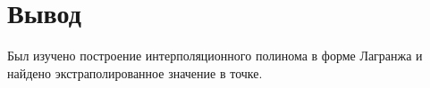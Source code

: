 \documentclass[../main.tex]{subfiles}
\begin{document}
\section{Вывод}

Был изучено построение интерполяционного полинома в форме Лагранжа и найдено экстраполированное значение в точке.
\end{document}

